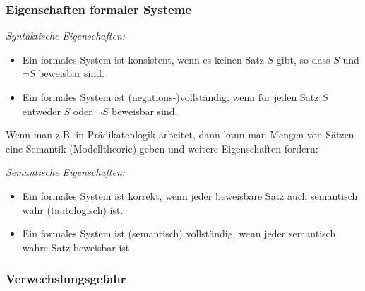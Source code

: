 \documentclass[onlymath]{beamer}
\begin{document}
\begin{frame}\frametitle{Eigenschaften formaler Systeme}


\emph{Syntaktische Eigenschaften:}
\begin{itemize}
\item {} Ein formales System ist konsistent, wenn es keinen Satz $S$ gibt,
so dass $S$ und $\neg S$ beweisbar sind.
\item {} Ein formales System ist (negations-)vollständig, wenn für jeden Satz $S$ entweder $S$ oder $\neg S$ beweisbar sind.
\end{itemize}
\medskip\pause

Wenn man z.B. in Prädikatenlogik arbeitet, dann kann man Mengen von Sätzen eine Semantik (Modelltheorie) geben und weitere Eigenschaften fordern:\medskip

\emph{Semantische Eigenschaften:}
\begin{itemize}
\item {} Ein formales System ist korrekt, wenn jeder beweisbare Satz auch semantisch wahr (tautologisch) ist.
\item {} Ein formales System ist (semantisch) vollständig, wenn jeder semantisch wahre Satz beweisbar ist.
\end{itemize}

\end{frame}

\begin{frame}\frametitle{Verwechslungsgefahr}


\end{frame}
\end{document}
